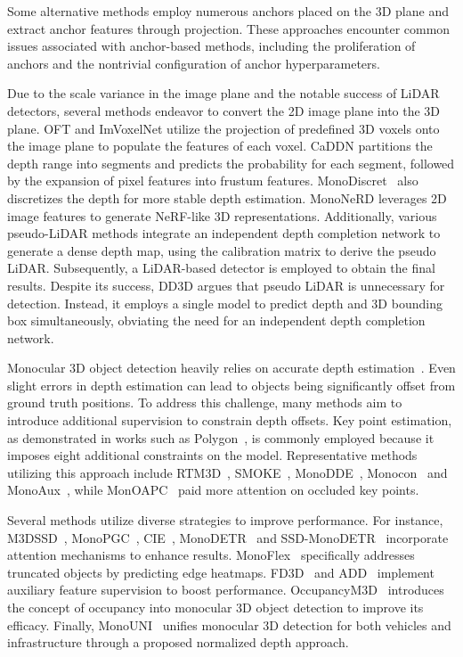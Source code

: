 \documentclass[journal]{IEEEtran}
\begin{document}
	Some alternative methods \cite{m3d-rpn, d4lcn, monodtr} employ numerous anchors placed on the 3D plane and extract anchor features through projection. These approaches encounter common issues associated with anchor-based methods, including the proliferation of anchors and the nontrivial configuration of anchor hyperparameters.
	
	Due to the scale variance in the image plane and the notable success of LiDAR detectors, several methods endeavor to convert the 2D image plane into the 3D plane. OFT \cite{oft} and ImVoxelNet \cite{imvoxelnet} utilize the projection of predefined 3D voxels onto the image plane to populate the features of each voxel. CaDDN \cite{caddn} partitions the depth range into segments and predicts the probability for each segment, followed by the expansion of pixel features into frustum features. MonoDiscret~\cite{tits discrete depth} also discretizes the depth for more stable depth estimation. MonoNeRD \cite{mononerd} leverages 2D image features to generate NeRF-like 3D representations. Additionally, various pseudo-LiDAR methods \cite{color-embeded, mono-plidar, patchnet} integrate an independent depth completion network to generate a dense depth map, using the calibration matrix to derive the pseudo LiDAR. Subsequently, a LiDAR-based detector is employed to obtain the final results. Despite its success, DD3D \cite{dd3d} argues that pseudo LiDAR is unnecessary for detection. Instead, it employs a single model to predict depth and 3D bounding box simultaneously, obviating the need for an independent depth completion network.
	
	Monocular 3D object detection heavily relies on accurate depth estimation~\cite{monodle, tits monopixel, tits depth estimation}. Even slight errors in depth estimation can lead to objects being significantly offset from ground truth positions. To address this challenge, many methods aim to introduce additional supervision to constrain depth offsets. Key point estimation, as demonstrated in works such as Polygon~\cite{polygon}, is commonly employed because it imposes eight additional constraints on the model. Representative methods utilizing this approach include RTM3D~\cite{rtm3d}, SMOKE~\cite{smoke}, MonoDDE~\cite{monodde}, Monocon~\cite{monocon} and MonoAux~\cite{tits aux}, while MonOAPC~\cite{tits plane cons} paid more attention on occluded key points.
	
	Several methods utilize diverse strategies to improve performance. For instance, M3DSSD~\cite{m3dssd}, MonoPGC~\cite{monopgc}, CIE~\cite{cie}, MonoDETR~\cite{monodetr} and SSD-MonoDETR~\cite{ssd-monodetr} incorporate attention mechanisms to enhance results. MonoFlex~\cite{monoflex} specifically addresses truncated objects by predicting edge heatmaps. FD3D~\cite{fd3d} and ADD~\cite{add} implement auxiliary feature supervision to boost performance. OccupancyM3D~\cite{occupancym3d} introduces the concept of occupancy into monocular 3D object detection to improve its efficacy. Finally, MonoUNI~\cite{monouni} unifies monocular 3D detection for both vehicles and infrastructure through a proposed normalized depth approach.
	
\end{document}

